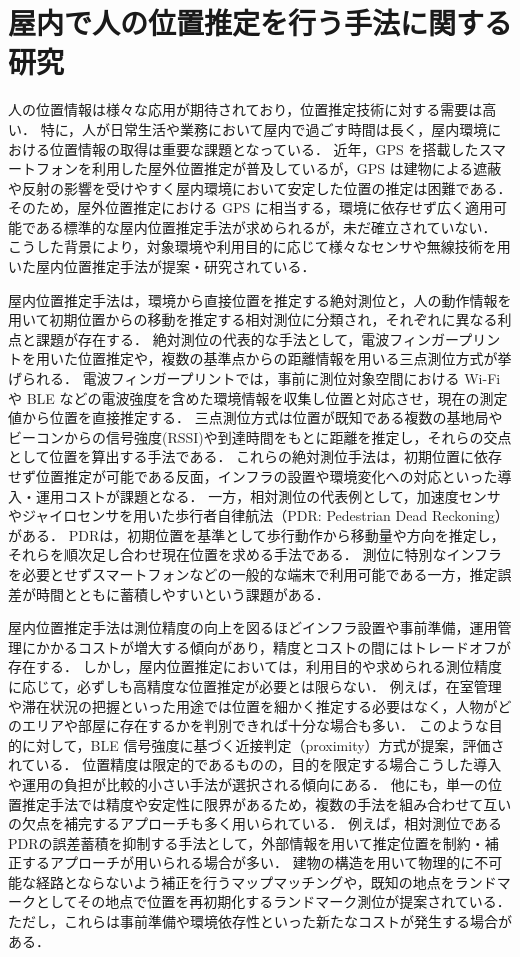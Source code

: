 \section{屋内で人の位置推定を行う手法に関する研究}
人の位置情報は様々な応用が期待されており，位置推定技術に対する需要は高い．
特に，人が日常生活や業務において屋内で過ごす時間は長く，屋内環境における位置情報の取得は重要な課題となっている．
近年，GPS を搭載したスマートフォンを利用した屋外位置推定が普及しているが，GPS は建物による遮蔽や反射の影響を受けやすく屋内環境において安定した位置の推定は困難である．
そのため，屋外位置推定における GPS に相当する，環境に依存せず広く適用可能である標準的な屋内位置推定手法が求められるが，未だ確立されていない．
こうした背景により，対象環境や利用目的に応じて様々なセンサや無線技術を用いた屋内位置推定手法が提案・研究されている．


屋内位置推定手法は，環境から直接位置を推定する絶対測位と，人の動作情報を用いて初期位置からの移動を推定する相対測位に分類され，それぞれに異なる利点と課題が存在する．
絶対測位の代表的な手法として，電波フィンガープリントを用いた位置推定や，複数の基準点からの距離情報を用いる三点測位方式が挙げられる．
電波フィンガープリントでは，事前に測位対象空間における Wi-Fi や BLE などの電波強度を含めた環境情報を収集し位置と対応させ，現在の測定値から位置を直接推定する\cite{fingerprint:WiFi}\cite{fingerprint:BLE}．
三点測位方式は位置が既知である複数の基地局やビーコンからの信号強度(RSSI)や到達時間をもとに距離を推定し，それらの交点として位置を算出する手法である\cite{threeposition:WiFi}\cite{threeposition:BLE}．
これらの絶対測位手法は，初期位置に依存せず位置推定が可能である反面，インフラの設置や環境変化への対応といった導入・運用コストが課題となる．
一方，相対測位の代表例として，加速度センサやジャイロセンサを用いた歩行者自律航法（PDR: Pedestrian Dead Reckoning）がある．
PDRは，初期位置を基準として歩行動作から移動量や方向を推定し，それらを順次足し合わせ現在位置を求める手法\cite{PDR:position}\cite{PDR:direction}である．
測位に特別なインフラを必要とせずスマートフォンなどの一般的な端末で利用可能である一方，推定誤差が時間とともに蓄積しやすいという課題がある．


屋内位置推定手法は測位精度の向上を図るほどインフラ設置や事前準備，運用管理にかかるコストが増大する傾向があり，精度とコストの間にはトレードオフが存在する．
しかし，屋内位置推定においては，利用目的や求められる測位精度に応じて，必ずしも高精度な位置推定が必要とは限らない．
例えば，在室管理や滞在状況の把握といった用途では位置を細かく推定する必要はなく，人物がどのエリアや部屋に存在するかを判別できれば十分な場合も多い．
このような目的に対して，BLE 信号強度に基づく近接判定（proximity）方式が提案，評価されている\cite{BLE:Proximity}．
位置精度は限定的であるものの，目的を限定する場合こうした導入や運用の負担が比較的小さい手法が選択される傾向にある．
他にも，単一の位置推定手法では精度や安定性に限界があるため，複数の手法を組み合わせて互いの欠点を補完するアプローチも多く用いられている．
例えば，相対測位であるPDRの誤差蓄積を抑制する手法として，外部情報を用いて推定位置を制約・補正するアプローチが用いられる場合が多い．
建物の構造を用いて物理的に不可能な経路とならないよう補正を行うマップマッチング\cite{mapmatching}や，既知の地点をランドマークとしてその地点で位置を再初期化するランドマーク測位\cite{landmark}が提案されている．
ただし，これらは事前準備や環境依存性といった新たなコストが発生する場合がある．